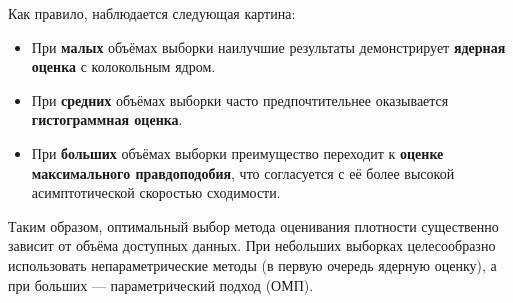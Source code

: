 \documentclass[12pt,a4paper]{article}
\begin{document}
Как правило, наблюдается следующая картина:
\begin{itemize}
    \item При \textbf{малых} объёмах выборки наилучшие результаты демонстрирует \textbf{ядерная оценка} с колокольным ядром.
    \item При \textbf{средних} объёмах выборки часто предпочтительнее оказывается \textbf{гистограммная оценка}.
    \item При \textbf{больших} объёмах выборки преимущество переходит к \textbf{оценке максимального правдоподобия}, что согласуется с её более высокой асимптотической скоростью сходимости.
\end{itemize}

Таким образом, оптимальный выбор метода оценивания плотности существенно зависит от объёма доступных данных. При небольших выборках целесообразно использовать непараметрические методы (в первую очередь ядерную оценку), а при больших — параметрический подход (ОМП).
\end{document}
